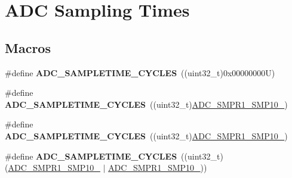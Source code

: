 \hypertarget{group___a_d_c__sampling__times}{}\section{A\+DC Sampling Times}
\label{group___a_d_c__sampling__times}
\subsection*{Macros}
\begin{DoxyCompactItemize}
\item 
\mbox{\label{group___a_d_c__sampling__times_gadd2dd58764750d84b32e7c814190953e}} 
\#define {\bfseries A\+D\+C\+\_\+\+S\+A\+M\+P\+L\+E\+T\+I\+M\+E\+\_\+C\+Y\+C\+L\+ES}~((uint32\+\_\+t)0x00000000\+U)
\item 
\mbox{\label{group___a_d_c__sampling__times_gabaea44ba33b9b0ff9b25c9a5f7b76a5b}} 
\#define {\bfseries A\+D\+C\+\_\+\+S\+A\+M\+P\+L\+E\+T\+I\+M\+E\+\_\+C\+Y\+C\+L\+ES}~((uint32\+\_\+t)\mbox{\hyperlink{group___peripheral___registers___bits___definition_ga8a8996c53042759f01e966fb00351ebf}{A\+D\+C\+\_\+\+S\+M\+P\+R1\+\_\+\+S\+M\+P10\+\_}})
\item 
\mbox{\label{group___a_d_c__sampling__times_ga02196395d86a06b6373292f91cf8a62c}} 
\#define {\bfseries A\+D\+C\+\_\+\+S\+A\+M\+P\+L\+E\+T\+I\+M\+E\+\_\+C\+Y\+C\+L\+ES}~((uint32\+\_\+t)\mbox{\hyperlink{group___peripheral___registers___bits___definition_ga42b96f058436c8bdcfabe1e08c7edd61}{A\+D\+C\+\_\+\+S\+M\+P\+R1\+\_\+\+S\+M\+P10\+\_}})
\item 
\mbox{\label{group___a_d_c__sampling__times_ga7a65819ad4542d680ddac1d5eebfe415}} 
\#define {\bfseries A\+D\+C\+\_\+\+S\+A\+M\+P\+L\+E\+T\+I\+M\+E\+\_\+C\+Y\+C\+L\+ES}~((uint32\+\_\+t)(\mbox{\hyperlink{group___peripheral___registers___bits___definition_ga42b96f058436c8bdcfabe1e08c7edd61}{A\+D\+C\+\_\+\+S\+M\+P\+R1\+\_\+\+S\+M\+P10\+\_}} $\vert$ \mbox{\hyperlink{group___peripheral___registers___bits___definition_ga8a8996c53042759f01e966fb00351ebf}{A\+D\+C\+\_\+\+S\+M\+P\+R1\+\_\+\+S\+M\+P10\+\_}}))
\item 
\mbox{\label{group___a_d_c__sampling__times_ga622a2822eeea3effd4360f1f975dc2f3}} 

\end{DoxyCompactItemize}
